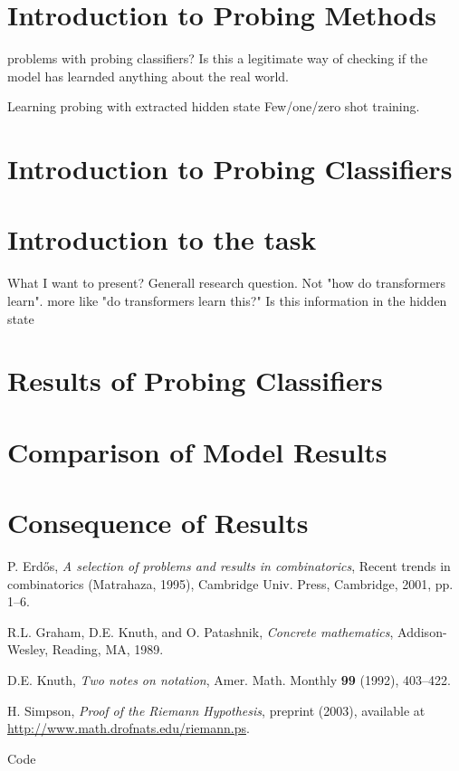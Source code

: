 \documentclass[11pt,a4paper,twoside,openright]{scrbook}
\begin{document}
\chapter{Introduction to Probing Methods}
problems with probing classifiers? Is this a legitimate way of checking if the model has learnded anything about the real world.

Learning probing with extracted hidden state
Few/one/zero shot training.
\chapter{Introduction to Probing Classifiers}
\chapter{Introduction to the task}
What I want to present? Generall research question. Not "how do transformers learn".
more like "do transformers learn this?" Is this information in the hidden state


\chapter{Results of Probing Classifiers}
\chapter{Comparison of Model Results}
\chapter{Consequence of Results}





\begin{thebibliography}{9}
 P. Erd\H os, \emph{A selection of problems and
results in combinatorics}, Recent trends in combinatorics (Matrahaza,
1995), Cambridge Univ. Press, Cambridge, 2001, pp. 1--6.

R.L. Graham, D.E. Knuth, and O. Patashnik, \emph{Concrete
mathematics}, Addison-Wesley, Reading, MA, 1989.

 D.E. Knuth, \emph{Two notes on notation}, Amer.
Math. Monthly \textbf{99} (1992), 403--422.

 H. Simpson, \emph{Proof of the Riemann
Hypothesis},  preprint (2003), available at
\url{http://www.math.drofnats.edu/riemann.ps}.
\end{thebibliography}
\newpage

\listoffigures
\newpage

\listoftables
\newpage

Code
\end{document}
